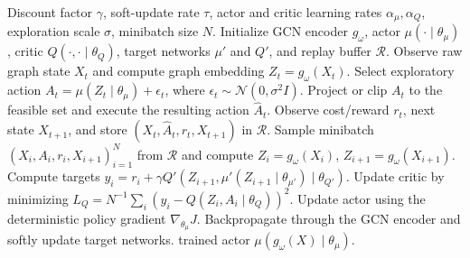 \documentclass[preprint,review,12pt,nonatbib]{elsarticle}
\providecommand{\DIFadd}[1]{{\protect\color{blue}#1}} %
\providecommand{\DIFdel}[1]{} %
\providecommand{\DIFaddbegin}{} %
\providecommand{\DIFaddend}{} %
\providecommand{\DIFdelbegin}{} %
\providecommand{\DIFdelend}{} %
\providecommand{\DIFscaledelfig}{0.5}
\newlength{\DIFdelgraphicswidth} %
\newlength{\DIFdelgraphicsheight} %
\providecommand{\DIFaddincludegraphics}[2][]{{\color{blue}\fbox{\DIFOincludegraphics[#1]{#2}}}} %
\providecommand{\DIFdelincludegraphics}[2][]{%
\sbox{\DIFdelgraphicsbox}{\DIFOincludegraphics[#1]{#2}}%
\settoboxwidth{\DIFdelgraphicswidth}{\DIFdelgraphicsbox} %
\settoboxtotalheight{\DIFdelgraphicsheight}{\DIFdelgraphicsbox} %
\scalebox{\DIFscaledelfig}{%
\parbox[b]{\DIFdelgraphicswidth}{\usebox{\DIFdelgraphicsbox}\\[-\baselineskip] \rule{\DIFdelgraphicswidth}{0em}}\llap{\resizebox{\DIFdelgraphicswidth}{\DIFdelgraphicsheight}{%
\setlength{\unitlength}{\DIFdelgraphicswidth}%
\begin{picture}(1,1)%
\thicklines\linethickness{2pt} %
{\color[rgb]{1,0,0}\put(0,0){\framebox(1,1){}}}%
{\color[rgb]{1,0,0}\put(0,0){\line( 1,1){1}}}%
{\color[rgb]{1,0,0}\put(0,1){\line(1,-1){1}}}%
\end{picture}%
}\hspace*{3pt}}} %
} %
\DeclareRobustCommand{\DIFaddbegin}{\DIFOaddbegin \let\includegraphics\DIFaddincludegraphics} %
\DeclareRobustCommand{\DIFaddend}{\DIFOaddend \let\includegraphics\DIFOincludegraphics} %
\DeclareRobustCommand{\DIFdelbegin}{\DIFOdelbegin \let\includegraphics\DIFdelincludegraphics} %
\DeclareRobustCommand{\DIFdelend}{\DIFOaddend \let\includegraphics\DIFOincludegraphics} %
\begin{document}
\begin{algorithm}[p]
\footnotesize
\caption{\DIFdelbegin \DIFdel{DDPG--GCN }\DIFdelend \DIFaddbegin \DIFadd{Graph-aware actor--critic }\DIFaddend for \DIFdelbegin \DIFdel{Distributed }\DIFdelend \DIFaddbegin \DIFadd{distributed }\DIFaddend PRM \DIFdelbegin \DIFdel{Capacity Planning}\DIFdelend \DIFaddbegin \DIFadd{capacity planning (DDPG instantiation; TD3/SAC/PPO swap the critic target, policy parameterization, or update schedule).}\DIFaddend }
\label{alg:ddpg_gcn}
\begin{algorithmic}[1]
\Require Discount factor $\gamma$, soft-update rate $\tau$, actor and critic learning rates $\alpha_\mu,\alpha_Q$, exploration scale $\sigma$, minibatch size $N$.
\State Initialize GCN encoder $g_\omega$, actor $\mu(\cdot\mid\theta_\mu)$, critic $Q(\cdot,\cdot\mid\theta_Q)$, target networks $\mu'$ and $Q'$, and replay buffer $\mathcal{R}$.
    \State Observe raw graph state $X_t$ and compute graph embedding $Z_t=g_\omega(X_t)$.
    \State Select exploratory action $A_t=\mu(Z_t\mid\theta_\mu)+\epsilon_t$, where $\epsilon_t\sim\mathcal{N}(0,\sigma^2 I)$.
    \State Project or clip $A_t$ to the feasible set and execute the resulting action $\hat{A}_t$.
    \State Observe cost/reward $r_t$, next state $X_{t+1}$, and store $(X_t,\hat{A}_t,r_t,X_{t+1})$ in $\mathcal{R}$.
        \State Sample minibatch $(X_i,A_i,r_i,X_{i+1})_{i=1}^{N}$ from $\mathcal{R}$ and compute $Z_i=g_\omega(X_i)$, $Z_{i+1}=g_\omega(X_{i+1})$.
        \State Compute targets $y_i=r_i+\gamma Q'(Z_{i+1},\mu'(Z_{i+1}\mid\theta_{\mu'})\mid\theta_{Q'})$.
        \State Update critic by minimizing $L_Q=N^{-1}\sum_i(y_i-Q(Z_i,A_i\mid\theta_Q))^2$.
        \State Update actor using the deterministic policy gradient $\nabla_{\theta_\mu}J$.
        \State Backpropagate through the GCN encoder and softly update target networks.
    \EndIf
\EndFor
\State \Return trained actor $\mu(g_\omega(X)\mid\theta_\mu)$.
\end{algorithmic}
\end{algorithm}
\end{document}
